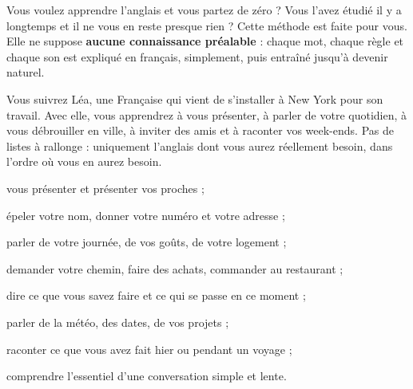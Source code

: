 
{\fontsize{11.4}{15.6}\selectfont
Vous voulez apprendre l'anglais et vous partez de zéro ? Vous l'avez étudié il y a longtemps
et il ne vous en reste presque rien ? Cette méthode est faite pour vous. Elle ne suppose
\textbf{aucune connaissance préalable} : chaque mot, chaque règle et chaque son est expliqué
en français, simplement, puis entraîné jusqu'à devenir naturel.\par\vspace{3mm}

Vous suivrez Léa, une Française qui vient de s'installer à New York pour son travail. Avec
elle, vous apprendrez à vous présenter, à parler de votre quotidien, à vous débrouiller en
ville, à inviter des amis et à raconter vos week-ends. Pas de listes à rallonge : uniquement
l'anglais dont vous aurez réellement besoin, dans l'ordre où vous en aurez besoin.\par}

\begin{paire}
\begin{tcolorbox}[otBase,colback=otNavyTint,colframe=otNavyTint]
\begin{list}{\otCheck}{\setlength{\leftmargin}{7mm}\setlength{\labelwidth}{4mm}\setlength{\labelsep}{3mm}
  \setlength{\itemsep}{1.6mm}\setlength{\topsep}{0pt}\setlength{\parsep}{0pt}}\fontsize{10.4}{13}\selectfont
\item vous présenter et présenter vos proches ;
\item épeler votre nom, donner votre numéro et votre adresse ;
\item parler de votre journée, de vos goûts, de votre logement ;
\item demander votre chemin, faire des achats, commander au restaurant ;
\end{list}
\end{tcolorbox}
\begin{tcolorbox}[otBase,colback=otNavyTint,colframe=otNavyTint]
\begin{list}{\otCheck}{\setlength{\leftmargin}{7mm}\setlength{\labelwidth}{4mm}\setlength{\labelsep}{3mm}
  \setlength{\itemsep}{1.6mm}\setlength{\topsep}{0pt}\setlength{\parsep}{0pt}}\fontsize{10.4}{13}\selectfont
\item dire ce que vous savez faire et ce qui se passe en ce moment ;
\item parler de la météo, des dates, de vos projets ;
\item raconter ce que vous avez fait hier ou pendant un voyage ;
\item comprendre l'essentiel d'une conversation simple et lente.
\end{list}
\end{tcolorbox}
\end{paire}

